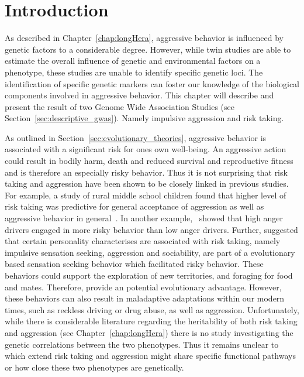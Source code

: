 \section{Introduction}
\label{sec:introduction}

As described in Chapter~\ref{chap:longHera}, aggressive behavior is influenced by genetic factors to a considerable degree.
However, while twin studies are able to estimate the overall influence of genetic and environmental factors on a phenotype, these studies are unable to identify specific genetic loci.
The identification of specific genetic markers can foster our knowledge of the biological components involved in aggressive behavior. 
This chapter will describe and present the result of two Genome Wide Association Studies (see Section~\ref{sec:descriptive_gwas}).
Namely impulsive aggression and risk taking.

As outlined in Section~\ref{sec:evolutionary_theories}, aggressive behavior is associated with a significant risk for ones own well-being.
An aggressive action could result in bodily harm, death and reduced survival and reproductive fitness and is therefore an especially risky behavior.
Thus it is not surprising that risk taking and aggression have been shown to be closely linked in previous studies.
For example, a study of rural middle school children found that higher level of risk taking was  predictive for general acceptance of aggression as well as aggressive behavior in general~\cite{Swaim2004}.
In another example,~\citet{Deffenbacher2003} showed that high anger drivers engaged in more risky behavior than low anger drivers.
Further, \citet{Zuckerman2000} suggested that certain personality characterises are associated with risk taking, namely impulsive sensation seeking, aggression and sociability, are part of a evolutionary based sensation seeking behavior which facilitated risky behavior.
These behaviors could support the exploration of new territories, and foraging for food and mates.
Therefore, provide an potential evolutionary advantage.
However, these behaviors can also result in maladaptive adaptations within our modern times, such as reckless driving or drug abuse, as well as aggression.
Unfortunately, while there is considerable literature regarding the heritability of both risk taking and aggression (see Chapter~\ref{chap:longHera}) there is no study investigating the genetic correlations between the two phenotypes.
Thus it remains unclear to which extend risk taking and aggression might share specific functional pathways or how close these two phenotypes are genetically.

